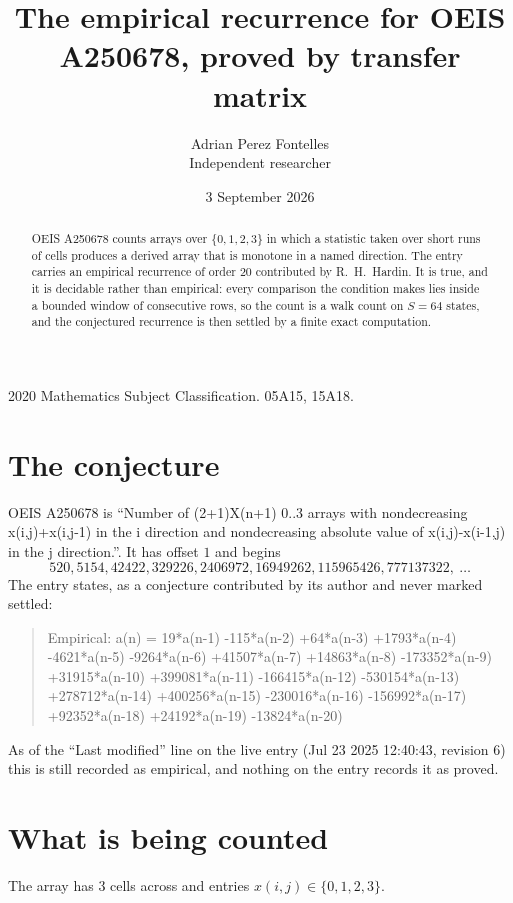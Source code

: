\documentclass[11pt,a4paper]{article}
\title{The empirical recurrence for OEIS A250678, proved by transfer matrix}
\author{Adrian Perez Fontelles\\ \small Independent researcher}
\date{3 September 2026}
\theoremstyle{plain}
\theoremstyle{definition}
\begin{document}
\maketitle

\begin{abstract}
OEIS A250678 counts arrays over $\{0,1,2,3\}$ in which a statistic taken over short runs
of cells produces a derived array that is monotone in a named direction. The entry carries an
empirical recurrence of order $20$ contributed by R.~H.~Hardin. It is true, and it is
decidable rather than empirical: every comparison the condition makes lies inside a bounded
window of consecutive rows, so the count is a walk count on $S=64$ states, and the
conjectured recurrence is then settled by a finite exact computation.
\end{abstract}

\noindent\small 2020 Mathematics Subject Classification. 05A15, 15A18.\normalsize

\section{The conjecture}

OEIS A250678 is ``Number of (2+1)X(n+1) 0..3 arrays with nondecreasing x(i,j)+x(i,j-1) in the i direction and nondecreasing absolute value of x(i,j)-x(i-1,j) in the j direction.''. It has offset $1$ and begins
\[
520, 5154, 42422, 329226, 2406972, 16949262, 115965426, 777137322,\ \dots
\]
The entry states, as a conjecture contributed by its author and never marked settled:
\begin{quote}
Empirical: a(n) = 19*a(n-1) -115*a(n-2) +64*a(n-3) +1793*a(n-4) -4621*a(n-5) -9264*a(n-6) +41507*a(n-7) +14863*a(n-8) -173352*a(n-9) +31915*a(n-10) +399081*a(n-11) -166415*a(n-12) -530154*a(n-13) +278712*a(n-14) +400256*a(n-15) -230016*a(n-16) -156992*a(n-17) +92352*a(n-18) +24192*a(n-19) -13824*a(n-20)
\end{quote}
As of the ``Last modified'' line on the live entry (Jul 23 2025 12:40:43, revision 6) this is still
recorded as empirical, and nothing on the entry records it as proved.

\section{What is being counted}

The array has $3$ cells across and entries $x(i,j)\in\{0,1,2,3\}$.
\end{document}
